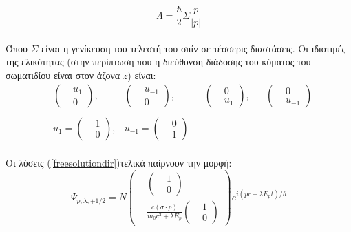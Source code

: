 \begin{equation}
  \Lambda=\frac{\hbar}{2}\Sigma \frac{p}{|p|} 
  \label{helicity}
\end{equation}\\
Όπου $\Sigma$ είναι η γενίκευση του τελεστή του σπίν σε τέσσερις διαστάσεις. Οι ιδιοτιμές της ελικότητας (στην περίπτωση που η διεύθυνση διάδοσης του κύματος του σωματιδίου είναι στον άζονα $z$) είναι: 
\begin{align*}
  &\begin{pmatrix}
    &u_1\\
     &0
   \end{pmatrix},
  &\begin{pmatrix}
     &u_{-1}\\
     &0
   \end{pmatrix},
  & & \begin{pmatrix}
       &0\\
       &u_1
     \end{pmatrix},
  & &\begin{pmatrix}
     &0\\
     &u_{-1}
   \end{pmatrix} \\ \\
  &u_{1}=
  \begin{pmatrix}
    &1\\
    &0
  \end{pmatrix},
  &u_{-1}=
  \begin{pmatrix}
    &0\\
    &1
  \end{pmatrix}
\end{align*}\\
Οι λύσεις (\ref{freesolutiondir})τελικά παίρνουν την μορφή:
\begin{equation*} 
  \Psi_{p,\lambda,+1/2} =N 
  \begin{pmatrix}
    &\begin{pmatrix} &1 \\ &0 \end{pmatrix}\\
    &\frac{c(\sigma \cdot p )}{m_0 c^2 + \lambda E_p}\begin{pmatrix} &1 \\ &0 \end{pmatrix}
  \end{pmatrix}
  e^{i(pr-\lambda E_p t)/\hbar}
\end{equation*}\\
